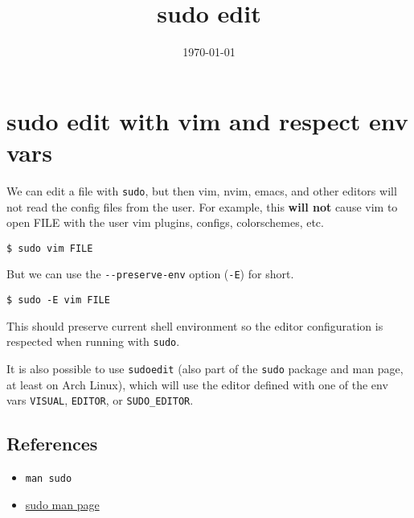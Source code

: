 \documentclass[11pt]{article}
\date{\today}
\title{sudo edit}
\begin{document}
\maketitle
\tableofcontents


\section{sudo edit with vim and respect env vars}
\label{sec:orgfaf2663}

We can edit a file with \texttt{sudo}, but then vim, nvim, emacs, and other
editors will not read the config files from the user. For example,
this \textbf{will not} cause vim to open FILE with the user vim plugins,
configs, colorschemes, etc.

\begin{verbatim}
$ sudo vim FILE
\end{verbatim}

But we can use the \texttt{-{}-{}preserve-env} option (\texttt{-E}) for short.

\begin{verbatim}
$ sudo -E vim FILE
\end{verbatim}

This should preserve current shell environment so the editor
configuration is respected when running with \texttt{sudo}.

It is also possible to use \texttt{sudoedit} (also part of the \texttt{sudo} package and
man page, at least on Arch Linux), which will use the editor defined
with one of the env vars \texttt{VISUAL}, \texttt{EDITOR}, or \texttt{SUDO\_EDITOR}.

\subsection{References}
\label{sec:org7f5a70c}

\begin{itemize}
\item \texttt{man sudo}
\item \href{https://man.archlinux.org/man/sudo.8}{sudo man page}
\end{itemize}
\end{document}
